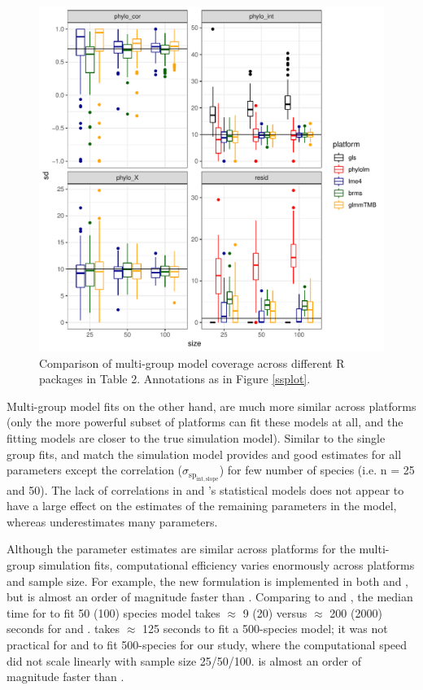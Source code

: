 \documentclass[12pt]{article}
\begin{document}
\begin{center}
\begin{figure}[H]
  \includegraphics[scale=0.8,page=6]{./git_push/plot.Rout.pdf}
  \caption{Comparison of multi-group model coverage across different R packages in Table 2. Annotations as in Figure \ref{ssplot}.}
  \label{msplot_coverage}
\end{figure}
\end{center}


Multi-group model fits on the other hand, are much more similar across platforms (only the more powerful subset of platforms can fit these models at all, and the fitting models are closer to the true simulation model).
Similar to the single group fits,  and  match the simulation model provides and good estimates for all parameters except the correlation ($\sigma_{\mathrm{sp_{int,slope}}}$) for few number of species (i.e. n = 25 and 50).
The lack of correlations in  and 's statistical models does not appear to have a large effect on the estimates of the remaining parameters in the model, whereas  underestimates many parameters.  

Although the parameter estimates are similar across platforms for the multi-group simulation fits, computational efficiency varies enormously across platforms and sample size.
For example, the new formulation is implemented in both  and , but  is almost an order of magnitude faster than .
Comparing  to  and , the median time for  to fit 50 (100) species model takes $\approx$ 9 (20) versus $\approx$ 200 (2000) seconds for  and . 
 takes $\approx$ 125 seconds to fit a 500-species model; it was not practical for  and  to fit 500-species for our study, where the computational speed did not scale linearly with sample size 25/50/100.
 is almost an order of magnitude faster than .
\end{document}
